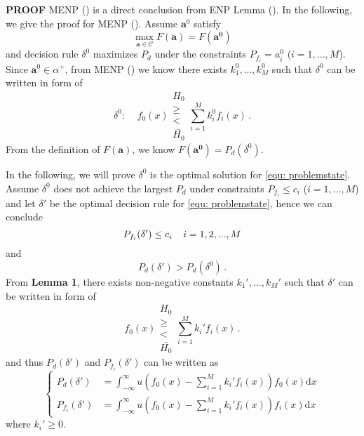 \textbf{PROOF}
MENP () is a direct conclusion from ENP Lemma (). In the following,  we give the proof for MENP (). Assume $\mathbf{a}^0$ satisfy
\begin{equation}
\label{a0}
\max_{\mathbf{a}\in\mathcal{C}} F(\mathbf{a}) = F(\mathbf{a^0})
\end{equation}
and decision rule $\delta^0$ maximizes $P_d$ under the constraints $P_{f_i} = a^0_i$ ($i = 1, ..., M$). Since $\mathbf{a}^0 \in \alpha^+$, from MENP () we know there exists $k_1^0, ..., k_M^0$ such that $\delta^0$ can be written in form of 
\[
\delta^0:\;\;\;\;f_0(x) \substack{H_0 \\ \geq \\ < \\ \bar{H_0}} \sum_{i=1}^{M}k_i^0f_i(x)\,.
\] 
From the definition of $F(\mathbf{a})$, we know $F(\mathbf{a^0}) = P_d(\delta^0)$.

In the following, we  will prove $\delta^0$ is the optimal solution for \eqref{equ: problemstate}. 
Assume  $\delta^0$ does not achieve the largest $P_d$ under constraints $P_{f_i} \leq c_i$ ($i=1, ..., M$) and let $\delta'$ be the optimal decision rule for \eqref{equ: problemstate}, hence  we can conclude
\begin{equation}
\label{condition 1}
P_{f_i}(\delta') \leq c_i\;\;\;\;i=1, 2, ..., M\\
\end{equation}
and
\begin{equation}
\label{condition 2}
P_{d}(\delta') > P_d(\delta^0)\,.
\end{equation}
From \textbf{Lemma 1}, there exists non-negative constants $k_1', ..., k_M'$ such that $\delta'$ can be written in form of 
\begin{equation}
f_0(x) \substack{H_0 \\ \geq \\ < \\ \bar{H_0}} \sum_{i=1}^{M}k_i'f_i(x)\,.
\label{2015feb20a1}
\end{equation}
and thus $P_d(\delta')$ and $P_{f_i}(\delta')$ can be written as
\begin{equation}
\begin{cases}
\label{TEMP10}
P_{d}(\delta') &= \int_{-\infty}^{\infty} u(f_0(x) - \sum_{i=1}^{M}k_i'f_i(x)) f_0(x) \mathrm{d}x\\
P_{f_i}(\delta') &= \int_{-\infty}^{\infty} u(f_0(x) - \sum_{i=1}^{M}k_i'f_i(x)) f_i(x) \mathrm{d}x
\end{cases}
\end{equation}
where $k_i' \geq 0$.


